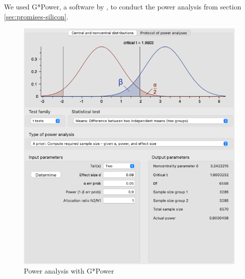 We used G*Power, a software by \citet{faul_statistical_2009}, to conduct the power analysis from section \ref{sec:promises-silicon}. 

\begin{figure}[H]
    \centering
    \includegraphics[width=0.9\linewidth]{0_TwoSamplePowerAnalysis.png}
    \caption{Power analysis with G*Power}
    \label{fig:gpower-power-analysis}
\end{figure}


